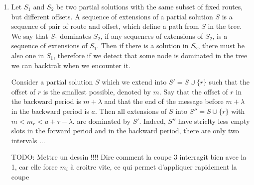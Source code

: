 \documentclass[a4paper,10pt]{article}
\newcommand{\todo}[1]{{\color{red} TODO: {#1}}}
\begin{document}
\begin{enumerate}
       \item 
       Let $S_1$ and $S_2$ be two partial solutions with the same subset of fixed routes, but different offsets.
       A sequence of extensions of a partial solution $S$ is a sequence of pair of route and offset, which define a path from $S$ in the tree. We say that $S_1$ dominates $S_2$, if any sequences of extensions of $S_2$, is a sequence of extensions of $S_1$.
       Then if there is a solution in $S_2$, there must be also one in $S_1$, therefore if we detect that some node is dominated in the tree we can backtrak when we encounter it. 
       
       
       Consider a partial solution $S$ which we extend into $S' = S \cup \{ r \}$ such that the offset of 
       $r$ is the smallest possible, denoted by $m$.
       Say that the offset of $r$ in the backward period is $m+ \lambda$ and that the end of the message before $m + \lambda$ in the backward period is $a$. Then all extensions of $S$ into $S'' = S \cup \{ r \}$ with $ m < m_r < a + \tau - \lambda$.
       are dominated by $S'$. Indeed, $S''$ have striclty less empty slots in the forward period and in the backward period, there are only two intervals ... 
       
       \todo{       Mettre un dessin !!!!  Dire comment la coupe 3 interragit bien avec la 1, car elle force $m_i$ à croitre vite, ce qui
       permet d'appliquer rapidement la coupe}
           
             \end{enumerate}
      
\end{document}
